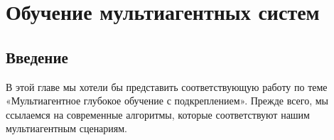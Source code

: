 \chapter{Обучение мультиагентных систем} \label{ch2}

\section{Введение} \label{ch2:intro}

В этой главе мы хотели бы представить соответствующую работу по теме «Мультиагентное глубокое обучение с подкреплением». Прежде всего, мы ссылаемся на современные алгоритмы, которые соответствуют нашим мультиагентным сценариям.




